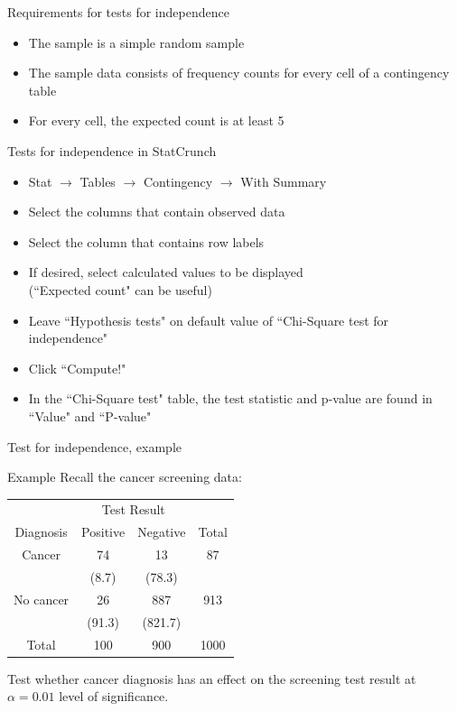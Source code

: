 \documentclass[xcolor=table]{beamer}
\begin{document}
\begin{frame}{Requirements for tests for independence}
\begin{block}{}
\large
\begin{itemize}
\item The sample is a simple random sample
\pause\item The sample data consists of frequency counts for every cell of a contingency table
\pause\item For every cell, the expected count is at least 5 
\end{itemize}
\end{block}
\end{frame}

\begin{frame}{Tests for independence in StatCrunch}
\begin{block}{}
\large
\begin{itemize}
\item Stat $\to$ Tables $\to$ Contingency $\to$ With Summary
\item Select the columns that contain observed data
\item Select the column that contains row labels
\item If desired, select calculated values to be displayed\\(``Expected count" can be useful)
\item Leave ``Hypothesis tests" on default value of ``Chi-Square test for independence"
\item Click ``Compute!"
\item In the ``Chi-Square test" table, the test statistic and p-value are found in ``Value" and ``P-value"
\end{itemize}
\end{block}

\end{frame}

\begin{frame}{Test for independence, example}
\begin{exampleblock}{Example}
\large
Recall the cancer screening data:\\
\smallskip
{\centering
\begin{tabular}{c | c  c | c}
\multicolumn{1}{c}{} & \multicolumn{2}{c}{Test Result}\\
Diagnosis & Positive & Negative & Total\\
\hline
Cancer & 74 & 13 & 87\\
& (8.7) & (78.3)\\
No cancer & 26 & 887 & 913 \\
& (91.3) & (821.7)\\
\hline
Total & 100 & 900 & 1000
\end{tabular}
\par}
\bigskip
Test whether cancer diagnosis has an effect on the screening test result at $\alpha = 0.01$ level of significance.
\end{exampleblock}
\end{frame}
\end{document}
